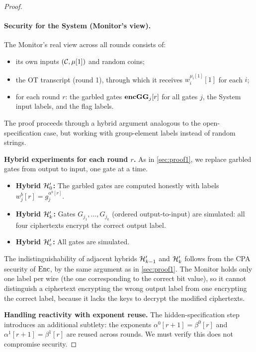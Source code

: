\begin{proof}
\paragraph{Security for the System (Monitor's view).}
The Monitor's real view across all rounds consists of:
\begin{itemize}
    \item its own inputs $(\mathcal{C}, \mu[1])$ and random coins;
    \item the OT transcript (round 1), through which it receives $w_i^{\mu_i[1]}[1]$ for each $i$;
    \item for each round $r$: the garbled gates $\textbf{encGG}_j[r]$ for all gates $j$, the System input labels, and the flag labels.
\end{itemize}

The proof proceeds through a hybrid argument analogous to the open-specification case, but working with group-element labels instead of random strings.

\medskip
\noindent\textbf{Hybrid experiments for each round $r$.} As in \cref{sec:proof1}, we replace garbled gates from output to input, one gate at a time.

\begin{itemize}
    \item \textbf{Hybrid $\mathcal{H}'_0$:} The garbled gates are computed honestly with labels $w_j^b[r] = g_j^{\alpha^b[r]}$.
    
    \item \textbf{Hybrid $\mathcal{H}'_k$:} Gates $G_{j_1}, \ldots, G_{j_k}$ (ordered output-to-input) are simulated: all four ciphertexts encrypt the correct output label.
    
    \item \textbf{Hybrid $\mathcal{H}'_c$:} All gates are simulated.
\end{itemize}

The indistinguishability of adjacent hybrids $\mathcal{H}'_{k-1}$ and $\mathcal{H}'_k$ follows from the CPA security of $\text{Enc}$, by the same argument as in \cref{sec:proof1}. The Monitor holds only one label per wire (the one corresponding to the correct bit value), so it cannot distinguish a ciphertext encrypting the wrong output label from one encrypting the correct label, because it lacks the keys to decrypt the modified ciphertexts.

\medskip
\noindent\textbf{Handling reactivity with exponent reuse.}
The hidden-specification step introduces an additional subtlety: the exponents $\alpha^0[r+1] = \beta^0[r]$ and $\alpha^1[r+1] = \beta^1[r]$ are reused across rounds. We must verify this does not compromise security.


\end{proof}
